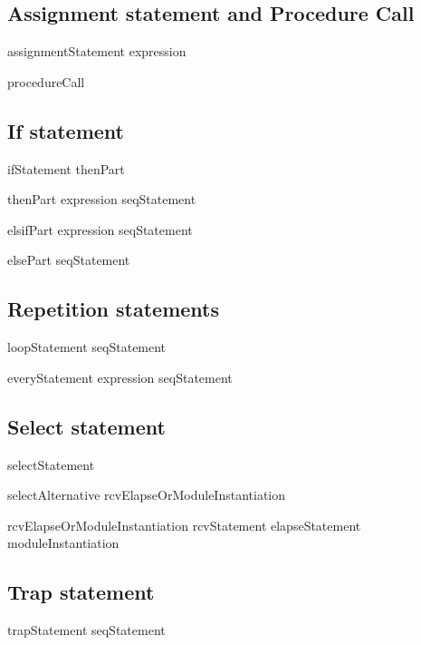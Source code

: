 \subsection{Assignment statement and Procedure Call}
\bgrm
assignmentStatement \Derive
   \trm{:=} expression
\egrm

\bgrm
procedureCall \Derive
   \trm{(}  \trm{)}
\egrm

\subsection{If statement}
\bgrm
ifStatement \Derive
   thenPart    
\egrm

\bgrm
thenPart \Derive
  expression  seqStatement   
\egrm

\bgrm
elsifPart \Derive
   expression  seqStatement
\egrm

\bgrm
elsePart \Derive
   seqStatement       
\egrm

\subsection{Repetition statements}
\bgrm                                    
loopStatement \Derive
     seqStatement  
\egrm

\bgrm
everyStatement \Derive
   expression  seqStatement  
\egrm

\subsection{Select statement}
\bgrm
selectStatement \Derive
      
\egrm

\bgrm
selectAlternative \Derive
  \trm{::} rcvElapseOrModuleInstantiation   
\egrm

\bgrm
rcvElapseOrModuleInstantiation \Derive
     rcvStatement                 
\alt elapseStatement              
\alt moduleInstantiation          
\egrm

\subsection{Trap statement}
\bgrm
trapStatement \Derive
     seqStatement  
\egrm

